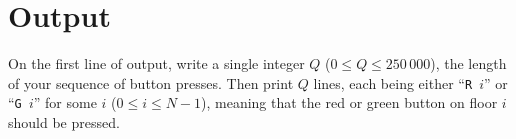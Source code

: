 \section*{Output}

On the first line of output, write a single integer $Q$ ($0 \le Q \le 250\,000$), the length of
your sequence of button presses. Then print $Q$ lines, each being either ``\texttt{R $i$}'' or
``\texttt{G $i$}'' for some $i$ ($0 \leq i \leq N-1$), meaning that the red or green button on floor
$i$ should be pressed.

